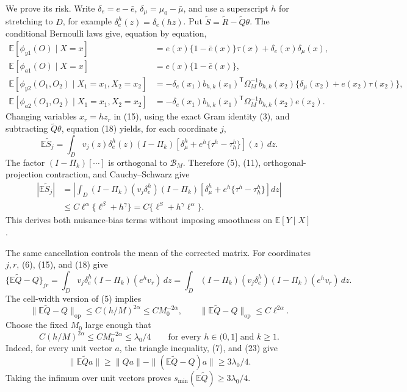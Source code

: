 We prove its risk.  Write \(\delta_e=e-\bar e\), \(\delta_\mu=\mu_0-\bar\mu\), and use a superscript \(h\) for stretching to \(D\), for example \(\delta_e^h(z)=\delta_e(hz)\).  Put \(\widetilde S=\widetilde R-\widetilde Q\theta\).  The conditional Bernoulli laws give, equation by equation,
\[
 \begin{split}
 \mathbb E[\phi_{y1}(O)\mid X=x]
 &=e(x)\{1-\bar e(x)\}\tau(x)+\delta_e(x)\delta_\mu(x),\\
 \mathbb E[\phi_{a1}(O)\mid X=x]
 &=e(x)\{1-\bar e(x)\},\\
 \mathbb E[\phi_{y2}(O_1,O_2)\mid X_1=x_1,X_2=x_2]
 &=-\delta_e(x_1)b_{h,k}(x_1)^{\mathsf T}\Omega_M^{-1}b_{h,k}(x_2)
 \{\delta_\mu(x_2)+e(x_2)\tau(x_2)\},\\
 \mathbb E[\phi_{a2}(O_1,O_2)\mid X_1=x_1,X_2=x_2]
 &=-\delta_e(x_1)b_{h,k}(x_1)^{\mathsf T}\Omega_M^{-1}b_{h,k}(x_2)e(x_2).
 \end{split}
 \tag{18}
\]
Changing variables \(x_r=hz_r\) in (15), using the exact Gram identity (3), and subtracting \(\widetilde Q\theta\), equation (18) yields, for each coordinate \(j\),
\[
 \mathbb E\widetilde S_j
 =\int_Dv_j(z)\delta_e^h(z)(I-\Pi_k)
 \left[\delta_\mu^h+e^h\{\tau^h-\tau_h^h\}\right](z)\,dz.
 \tag{19}
\]
The factor \((I-\Pi_k)[\cdots]\) is orthogonal to \(\mathcal B_M\).  Therefore (5), (11), orthogonal-projection contraction, and Cauchy--Schwarz give
\[
 \begin{split}
 |\mathbb E\widetilde S_j|
 &=\left|\int_D(I-\Pi_k)(v_j\delta_e^h)
 (I-\Pi_k)\left[\delta_\mu^h+e^h\{\tau^h-\tau_h^h\}\right]dz\right|\\
 &\leq C\ell^\alpha\{\ell^\beta+h^\gamma\}
 =C\{\ell^S+h^\gamma\ell^\alpha\}.
 \end{split}
 \tag{20}
\]
This derives both nuisance-bias terms without imposing smoothness on \(\mathbb E[Y\mid X]\).

The same cancellation controls the mean of the corrected matrix.  For coordinates \(j,r\), (6), (15), and (18) give
\[
 \{\mathbb E\widetilde Q-Q\}_{jr}
 =\int_Dv_j\delta_e^h(I-\Pi_k)(e^hv_r)\,dz
 =\int_D(I-\Pi_k)(v_j\delta_e^h)(I-\Pi_k)(e^hv_r)\,dz.
 \tag{21}
\]
The cell-width version of (5) implies
\[
 \|\mathbb E\widetilde Q-Q\|_{\mathrm{op}}
 \leq C(h/M)^{2\alpha}\leq C M_0^{-2\alpha},
 \qquad
 \|\mathbb E\widetilde Q-Q\|_{\mathrm{op}}\leq C\ell^{2\alpha}.
 \tag{22}
\]
Choose the fixed \(M_0\) large enough that
\[
 C(h/M)^{2\alpha}\leq C M_0^{-2\alpha}\leq\lambda_0/4
 \qquad\text{for every }h\in(0,1]\text{ and }k\geq1.
 \tag{23}
\]
Indeed, for every unit vector \(a\), the triangle inequality, (7), and (23) give
\[
 \|\mathbb E\widetilde Q a\|
 \geq\|Qa\|-\|(\mathbb E\widetilde Q-Q)a\|
 \geq3\lambda_0/4.
\tag{24}
\]
Taking the infimum over unit vectors proves \(s_{\min}(\mathbb E\widetilde Q)\geq3\lambda_0/4\).

